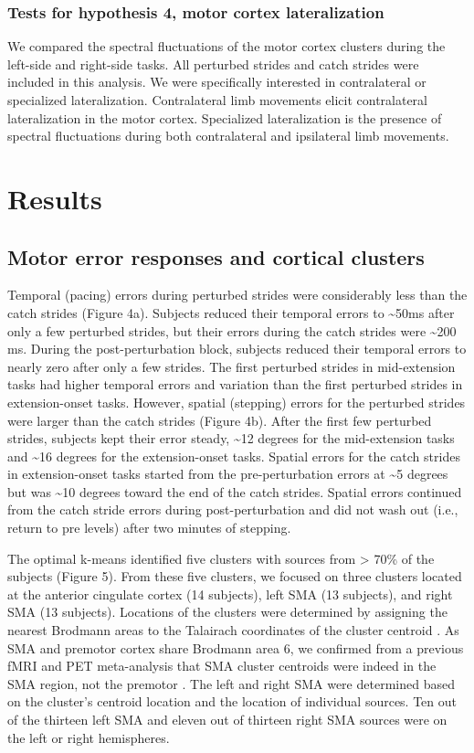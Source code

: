 \documentclass[shortpaper,twoside,web]{ieeecolor}
\newcommand{\td}{\textasciitilde}
\begin{document}
\subsubsection{Tests for hypothesis 4, motor cortex lateralization}
We compared the spectral fluctuations of the motor cortex clusters during the left-side and right-side tasks. All perturbed strides and catch strides were included in this analysis. We were specifically interested in contralateral or specialized lateralization. Contralateral limb movements elicit contralateral lateralization in the motor cortex. Specialized lateralization is the presence of spectral fluctuations during both contralateral and ipsilateral limb movements.

\section{Results}
\label{sec:methods}
\subsection{Motor error responses and cortical clusters}

Temporal (pacing) errors during perturbed strides were considerably less than the catch strides (Figure 4a). Subjects reduced their temporal errors to \td50ms after only a few perturbed strides, but their errors during the catch strides were \td200 ms. During the post-perturbation block, subjects reduced their temporal errors to nearly zero after only a few strides. The first perturbed strides in mid-extension tasks had higher temporal errors and variation than the first perturbed strides in extension-onset tasks. However, spatial (stepping) errors for the perturbed strides were larger than the catch strides (Figure 4b). After the first few perturbed strides, subjects kept their error steady, \td12 degrees for the mid-extension tasks and \td16 degrees for the extension-onset tasks. Spatial errors for the catch strides in extension-onset tasks started from the pre-perturbation errors at \td5 degrees but was \td10 degrees toward the end of the catch strides. Spatial errors continued from the catch stride errors during post-perturbation and did not wash out (i.e., return to pre levels) after two minutes of stepping.

The optimal k-means identified five clusters with sources from > 70\% of the subjects (Figure 5). From these five clusters, we focused on three clusters located at the anterior cingulate cortex (14 subjects), left SMA (13 subjects), and right SMA (13 subjects). Locations of the clusters were determined by assigning the nearest Brodmann areas to the Talairach coordinates of the cluster centroid \cite{Shirazi2019-im}. As SMA and premotor cortex share Brodmann area 6, we confirmed from a previous fMRI and PET meta-analysis that SMA cluster centroids were indeed in the SMA region, not the premotor \cite{Mayka2006-ye}. The left and right SMA were determined based on the cluster’s centroid location and the location of individual sources. Ten out of the thirteen left SMA and eleven out of thirteen right SMA sources were on the left or right hemispheres.
\end{document}
